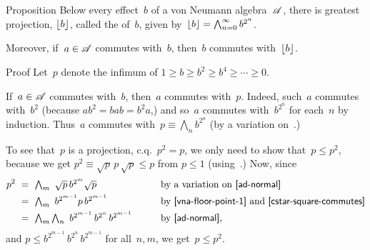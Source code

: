 \documentclass[main]{subfiles}
\begin{document}
%
%
\begin{parsec}%
\begin{point}{Proposition}%
Below every effect~$b$ of a von Neumann algebra~$\mathscr{A}$,
there is greatest projection, $\left\lfloor b\right\rfloor$,
called the  of~$b$,
given by~$\left\lfloor b\right\rfloor = \bigwedge_{n=0}^\infty b^{2^{n}}$.
\begin{point}%
Moreover, if~$a\in \mathscr{A}$ commutes with~$b$,
then~$b$ commutes with~$\left\lfloor b\right\rfloor$.
\end{point}
\end{point}
\begin{point}{Proof}%
Let~$p$ denote the infimum of $1\geq b\geq b^2 \geq b^4 \geq  \dotsb \geq 0$.
\begin{point}%
If~$a\in \mathscr{A}$ commutes with~$b$,
then~$a$ commutes with~$p$.
Indeed, such~$a$ commutes with~$b^2$ (because
$ab^2 = bab = b^2a$,)
and so~$a$ commutes with~$b^{2^n}$ for each~$n$ by induction.
Thus~$a$ commutes with~$p\equiv\bigwedge_n b^{2^n}$ 
(by a variation on~.)
\end{point}
\begin{point}%
To see that~$p$ is a projection, c.q.~$p^2=p$,
we only need to show that~$p\leq p^2$,
because we get $p^2\equiv \sqrt{p}\,p\,\sqrt{p}\leq p$
from $p\leq 1$ (using~.)
Now, since
\begin{alignat*}{3}
p^2 \ &=\ \textstyle \bigwedge_m\  \sqrt{p}\, b^{2^m} \sqrt{p}\qquad
&&\text{by a variation on~\sref{ad-normal}}\\
&=\ \textstyle \bigwedge_m \ b^{2^{m-1}} p\, b^{2^{m-1}}\qquad
&&\text{by~\sref{vna-floor-point-1} and~\sref{cstar-square-commutes}}\\
&=\ \textstyle \bigwedge_m \bigwedge_n \ 
b^{2^{m-1}}\, b^{2^n}\, b^{2^{m-1}}\qquad
&&\text{by~\sref{ad-normal},}
\end{alignat*}
and $p\leq b^{2^{m-1}}\, b^{2^n}\,b^{2^{m-1}}$
for all~$n,m$, we get~$p\leq p^2$.
\end{point}
\end{point}
\end{parsec}
\end{document}
